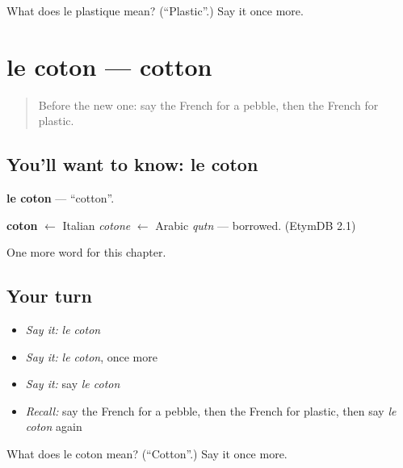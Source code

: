\begin{tcolorbox}[breakable,colback=teal!4,colframe=teal!35!black,title={Before you move on}]
What does le plastique mean? (\textquotedblleft{}Plastic\textquotedblright{}.) Say it once more.
\end{tcolorbox}
\section[le coton]{le coton — cotton}

\label{lesson:FR-C172-coton}



\begin{quote}
Before the new one: say the French for a pebble, then the French for plastic.
\end{quote}

\subsection*{You'll want to know: le coton}
\textbf{le coton} — \textquotedblleft{}cotton\textquotedblright{}.

\begin{cousinweb}
\textbf{coton} $\leftarrow$ Italian \emph{cotone} $\leftarrow$ Arabic \emph{qutn} — borrowed. (EtymDB 2.1)
\end{cousinweb}

\begin{grammarlens}[title={What you've built}]
One more word for this chapter.
\end{grammarlens}

\subsection*{Your turn}
\begin{itemize}
\raggedright
  \item \emph{Say it:} \emph{le coton}
  \item \emph{Say it:} \emph{le coton}, once more
  \item \emph{Say it:} say \emph{le coton}
  \item \emph{Recall:} say the French for a pebble, then the French for plastic, then say \emph{le coton} again
\end{itemize}

\begin{tcolorbox}[breakable,colback=teal!4,colframe=teal!35!black,title={Before you move on}]
What does le coton mean? (\textquotedblleft{}Cotton\textquotedblright{}.) Say it once more.
\end{tcolorbox}
